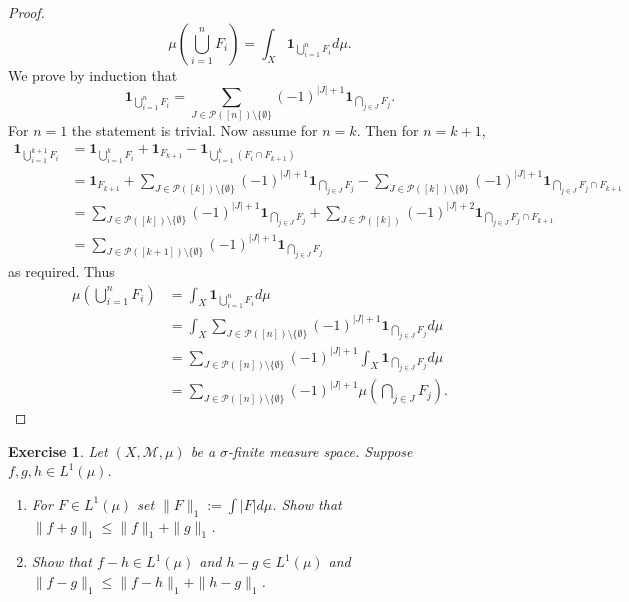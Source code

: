 \documentclass{article}
\newtheorem{exercise}[theorem]{Exercise}
\begin{document}
\begin{proof}
\[\mu(\bigcup_{i=1}^n F_i)=\int_X \mathbf{1}_{\bigcup_{i=1}^n F_i}d\mu.\] We prove by induction that \[\mathbf{1}_{\bigcup_{i=1}^nF_i}=\sum_{J\in\mathcal{P}([n])\setminus\{\emptyset\}}(-1)^{|J|+1}\mathbf{1}_{\bigcap_{j\in J}F_j}.\] For $n=1$ the statement is trivial. Now assume for $n=k$. Then for $n=k+1$, \begin{align*}\mathbf{1}_{\bigcup_{i=1}^{k+1}F_i}&=\mathbf{1}_{\bigcup_{i=1}^kF_i}+\mathbf{1}_{F_{k+1}}-\mathbf{1}_{\bigcup_{i=1}^k(F_i\cap F_{k+1})}\\&=\mathbf{1}_{F_{k+1}}+\sum_{J\in\mathcal{P}([k])\setminus\{\emptyset\}}(-1)^{|J|+1}\mathbf{1}_{\bigcap_{j\in J}F_j}-\sum_{J\in\mathcal{P}([k])\setminus\{\emptyset\}}(-1)^{|J|+1}\mathbf{1}_{\bigcap_{j\in J}F_j\cap F_{k+1}}\\&=\sum_{J\in\mathcal{P}([k])\setminus\{\emptyset\}}(-1)^{|J|+1}\mathbf{1}_{\bigcap_{j\in J}F_j}+\sum_{J\in\mathcal{P}([k])}(-1)^{|J|+2}\mathbf{1}_{\bigcap_{j\in J}F_j\cap F_{k+1}}\\&=\sum_{J\in\mathcal{P}([k+1])\setminus\{\emptyset\}}(-1)^{|J|+1}\mathbf{1}_{\bigcap_{j\in J}F_j}\end{align*} as required. Thus \begin{align*}
    \mu(\bigcup_{i=1}^nF_i)&=\int_X\mathbf{1}_{\bigcup_{i=1}^nF_i}d\mu\\&=\int_X \sum_{J\in\mathcal{P}([n])\setminus\{\emptyset\}}(-1)^{|J|+1}\mathbf{1}_{\bigcap_{j\in J}F_j}d\mu\\&=\sum_{J\in\mathcal{P}([n])\setminus\{\emptyset \}}(-1)^{|J|+1}\int_X\mathbf{1}_{\bigcap_{j\in J}F_j}d\mu\\&=\sum_{J\in\mathcal{P}([n])\setminus\{\emptyset \}}(-1)^{|J|+1}\mu(\bigcap_{j\in J}F_j).
\end{align*}
\end{proof}
\begin{exercise}
Let \( (X, \mathcal{M}, \mu) \) be a \(\sigma\)-finite measure space. Suppose \( f,g,h \in L^1(\mu) \).
\begin{enumerate}   
\item[(a)] For \( F \in L^1(\mu) \) set \( \|F\|_1 := \int |F| d\mu \). Show that \( \|f + g\|_1 \leq \|f\|_1 + \|g\|_1 \).
    
\item[(b)] Show that \( f - h \in L^1(\mu) \) and \( h - g \in L^1(\mu) \) and \( \|f - g\|_1 \leq \|f - h\|_1 + \|h - g\|_1 \).
\end{enumerate}
\end{exercise}
\end{document}
